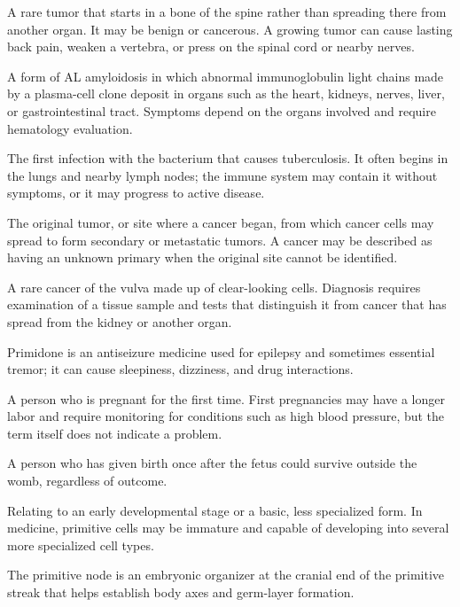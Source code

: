  A rare tumor that starts in a bone
  of the spine rather than spreading there from another organ. It may be
  benign or cancerous. A growing tumor can cause lasting back pain,
  weaken a vertebra, or press on the spinal cord or nearby nerves.

 A form of AL amyloidosis in which abnormal immunoglobulin light chains made by a plasma-cell clone deposit in organs such as the heart, kidneys, nerves, liver, or gastrointestinal tract. Symptoms depend on the organs involved and require hematology evaluation.

 The first infection with the bacterium that causes tuberculosis. It often begins in the lungs and nearby lymph nodes; the immune system may contain it without symptoms, or it may progress to active disease.

 The original tumor, or site where a cancer began, from which cancer cells may spread to form secondary or metastatic tumors. A cancer may be described as having an unknown primary when the original site cannot be identified.

 A rare cancer of the vulva made up of clear-looking cells. Diagnosis requires examination of a tissue sample and tests that distinguish it from cancer that has spread from the kidney or another organ.

 Primidone is an antiseizure medicine used for epilepsy and sometimes essential tremor; it can cause sleepiness, dizziness, and drug interactions.

 A person who is pregnant for the first time. First pregnancies may have a longer labor and require monitoring for conditions such as high blood pressure, but the term itself does not indicate a problem.

 A person who has given birth once after the fetus could survive outside the womb, regardless of outcome.

 Relating to an early developmental stage or a basic, less specialized form. In medicine, primitive cells may be immature and capable of developing into several more specialized cell types.

 The primitive node is an embryonic organizer at the cranial end of the primitive streak that helps establish body axes and germ-layer formation.

